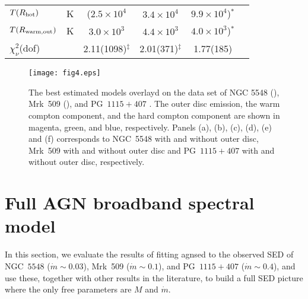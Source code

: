 \documentclass[a4paper,fleqn,usenatbib]{mnras}
\begin{document}
\begin{table}
\begin{tabular}{lccccc}
$T(R_{\rm hot})$ &K&($2.5\times 10^4$&$3.4\times 10^4$&$9.9\times 10^4$)$^\ast$\\
$T(R_{\rm warm,out})$ &K&$3.0\times10^3$&$4.4\times 10^3$&$4.0\times 10^3$)$^\ast$\\
\hline
$\chi^2 _\nu$(dof) &&2.11(1098)$^\ddagger$&2.01(371)$^\ddagger$&1.77(185)\\ \hline
	\end{tabular}
\end{table}


\begin{figure*}
\texttt{[image: fig4.eps]}
%
%
    \caption{The best estimated models
    overlayd on the data set of NGC 5548 (\citealt[Fig. 10]{5548}), Mrk~509 (\citealt[Fig. 12]{509}), and PG~$1115+407$ \citep{jin2012a,jin2012b}.
    The outer disc emission, the warm compton component, and the hard compton component are shown in magenta, green, and blue, respectively. Panels (a), (b), (c), (d), (e) and (f) corresponds to NGC~5548 with and without outer disc, Mrk~509 with and without outer disc and PG~$1115+407$ with and without outer disc, respectively.}
\label{fig:fit}
\end{figure*}

\section{Full AGN broadband spectral model}
\label{sec:summary}

In this section, we evaluate the results of 
fitting {\sc agnsed} to the 
observed SED of NGC~$5548$ ($\dot{m}\sim 0.03$), Mrk~509
($\dot{m}\sim 0.1$), and PG~$1115+407$ ($\dot{m}\sim 0.4$), and 
use these, together with other results in the literature, to 
build a full SED picture where the only free
parameters are $M$ and $\dot{m}$.
\end{document}
